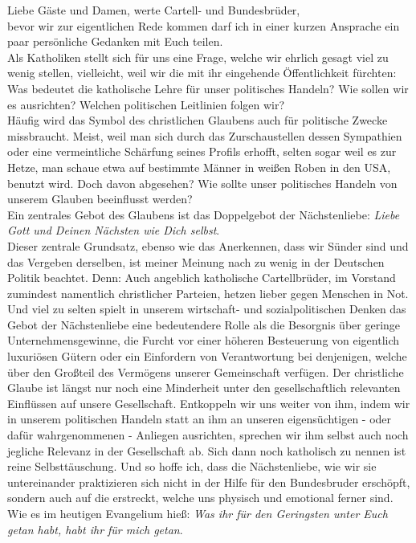 \begin{multicols}{2}
Liebe Gäste und Damen, werte Cartell- und Bundesbrüder,
\\
bevor wir zur eigentlichen Rede kommen darf ich in einer kurzen Ansprache ein paar persönliche Gedanken mit Euch teilen.
\\
Als Katholiken stellt sich für uns eine Frage, welche wir ehrlich gesagt viel zu wenig stellen, vielleicht, weil wir die mit ihr eingehende Öffentlichkeit fürchten:
Was bedeutet die katholische Lehre für unser politisches Handeln? Wie sollen wir es ausrichten? Welchen politischen Leitlinien folgen wir?
\\
Häufig wird das Symbol des christlichen Glaubens auch für politische Zwecke missbraucht. Meist, weil man sich durch das Zurschaustellen dessen Sympathien oder eine vermeintliche Schärfung seines Profils erhofft, selten sogar weil es zur Hetze, man schaue etwa auf bestimmte Männer in weißen Roben in den USA, benutzt wird.
Doch davon abgesehen? Wie sollte unser politisches Handeln von unserem Glauben beeinflusst werden?
\\
Ein zentrales Gebot des Glaubens ist das Doppelgebot der Nächstenliebe: \textit{Liebe Gott und Deinen Nächsten wie Dich selbst}.
\\
Dieser zentrale Grundsatz, ebenso wie das Anerkennen, dass wir Sünder sind und das Vergeben derselben, ist meiner Meinung nach zu wenig in der Deutschen Politik beachtet. Denn: Auch angeblich katholische Cartellbrüder, im Vorstand zumindest namentlich christlicher Parteien, hetzen lieber gegen Menschen in Not. Und viel zu selten spielt in unserem wirtschaft- und sozialpolitischen Denken das Gebot der Nächstenliebe eine bedeutendere Rolle als die Besorgnis über geringe Unternehmensgewinne, die Furcht vor einer höheren Besteuerung von eigentlich luxuriösen Gütern oder ein Einfordern von Verantwortung bei denjenigen, welche über den Großteil des Vermögens unserer Gemeinschaft verfügen. Der christliche Glaube ist längst nur noch eine Minderheit unter den gesellschaftlich relevanten Einflüssen auf unsere Gesellschaft. Entkoppeln wir uns weiter von ihm, indem wir in unserem politischen Handeln statt an ihm an unseren eigensüchtigen - oder dafür wahrgenommenen - Anliegen ausrichten, sprechen wir ihm selbst auch noch jegliche Relevanz in der Gesellschaft ab. Sich dann noch katholisch zu nennen ist reine Selbsttäuschung.
Und so hoffe ich, dass die Nächstenliebe, wie wir sie untereinander praktizieren sich nicht in der Hilfe für den Bundesbruder erschöpft, sondern auch auf die erstreckt, welche uns physisch und emotional ferner sind. Wie es im heutigen Evangelium hieß: \glqq\textit{Was ihr für den Geringsten unter Euch getan habt, habt ihr für mich getan}\grqq.
\\



\end{multicols}
